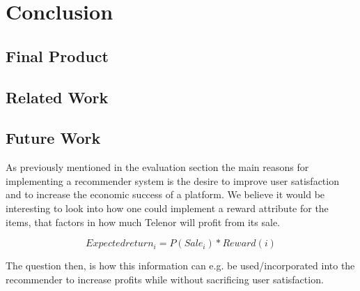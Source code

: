 
\chapter{Conclusion}
\minitoc

\clearpage

\section{Final Product}


\section{Related Work}


\section{Future Work}



As previously mentioned in the evaluation section the main reasons for implementing a recommender
system is the desire to improve user satisfaction and to increase the economic success of a platform.
We believe it would be interesting to look into how one could implement a reward attribute for the
items, that factors in how much Telenor will profit from its sale.

\begin{equation}
Expected return_i = P(Sale_i) * Reward(i)
\end{equation}


The question then, is how this information can e.g. be used/incorporated into the recommender to
increase profits while without sacrificing user satisfaction.

